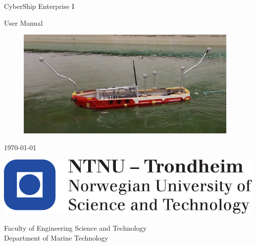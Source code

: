 \documentclass[12pt]{report}
\begin{document}
\thispagestyle{empty}

\vspace*{3cm}

\begin{center}
	{\LARGE{}CyberShip Enterprise I}
	\par\end{center}{\LARGE \par}

\begin{center}
	{\LARGE{}User Manual }
	\par\end{center}{\LARGE \par}

\begin{figure}[h!]
	\centering
	\includegraphics[width=0.5\linewidth]{fig/CSE1.png}
\end{figure}
\begin{center}
{\today }
\end{center}


\begin{flushleft}
	\vfill{}
	\par\end{flushleft}

\begin{flushleft}
	\includegraphics[scale=0.6]{fig/NTNU_logo.pdf}
	\par\end{flushleft}
Faculty of Engineering Science and Technology\\
Department of Marine Technology

\clearpage{}%

\setcounter{page}{0}

\tableofcontents
\setcounter{page}{0}


%

  
\end{document}
